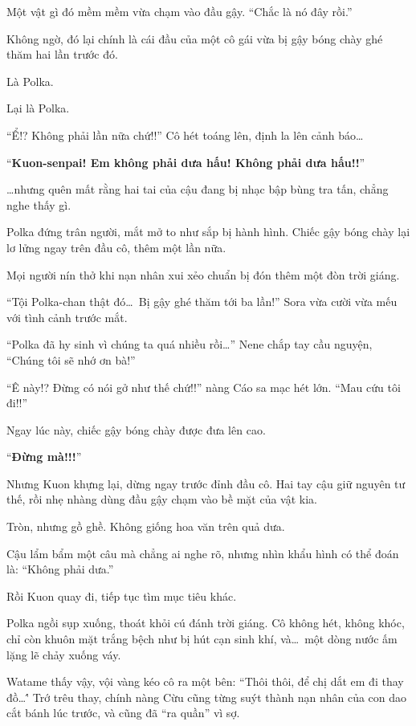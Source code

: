 \documentclass[../main.tex]{subfiles}
\begin{document}
Một vật gì đó mềm mềm vừa chạm vào đầu gậy. ``Chắc là nó đây rồi.''

Không ngờ, đó lại chính là cái đầu của một cô gái vừa bị gậy bóng chày ghé thăm hai lần trước đó.

Là Polka.

Lại là Polka.

``Ể!? Không phải lần nữa chứ!!'' Cô hét toáng lên, định la lên cảnh báo\dots

``\textbf{Kuon-senpai! Em không phải dưa hấu! Không phải dưa hấu!!}''

\dots nhưng quên mất rằng hai tai của cậu đang bị nhạc bập bùng tra tấn, chẳng nghe thấy gì.

Polka đứng trân người, mắt mở to như sắp bị hành hình. Chiếc gậy bóng chày lại lơ lửng ngay trên đầu cô, thêm một lần nữa.

Mọi người nín thở khi nạn nhân xui xẻo chuẩn bị đón thêm một đòn trời giáng.

``Tội Polka-chan thật đó\dots\ Bị gậy ghé thăm tới ba lần!'' Sora vừa cười vừa mếu với tình cảnh trước mắt.

``Polka đã hy sinh vì chúng ta quá nhiều rồi\dots'' Nene chắp tay cầu nguyện, ``Chúng tôi sẽ nhớ ơn bà!''

``Ê này!? Đừng có nói gở như thế chứ!!'' nàng Cáo sa mạc hét lớn. ``Mau cứu tôi đi!!''

Ngay lúc này, chiếc gậy bóng chày được đưa lên cao.

``\textbf{Đừng mà!!!}''

Nhưng Kuon khựng lại, dừng ngay trước đỉnh đầu cô. Hai tay cậu giữ nguyên tư thế, rồi nhẹ nhàng dùng đầu gậy chạm vào bề mặt của vật kia.

Tròn, nhưng gồ ghề. Không giống hoa văn trên quả dưa.

Cậu lẩm bẩm một câu mà chẳng ai nghe rõ, nhưng nhìn khẩu hình có thể đoán là: ``Không phải dưa.''

Rồi Kuon quay đi, tiếp tục tìm mục tiêu khác.

Polka ngồi sụp xuống, thoát khỏi cú đánh trời giáng. Cô không hét, không khóc, chỉ còn khuôn mặt trắng bệch như bị hút cạn sinh khí, và\dots\ một dòng nước ấm lặng lẽ chảy xuống váy.

Watame thấy vậy, vội vàng kéo cô ra một bên: ``Thôi thôi, để chị dắt em đi thay đồ\dots\'' Trớ trêu thay, chính nàng Cừu cũng từng suýt thành nạn nhân của con dao cắt bánh lúc trước, và cũng đã ``ra quần'' vì sợ.

\ct
\end{document}

